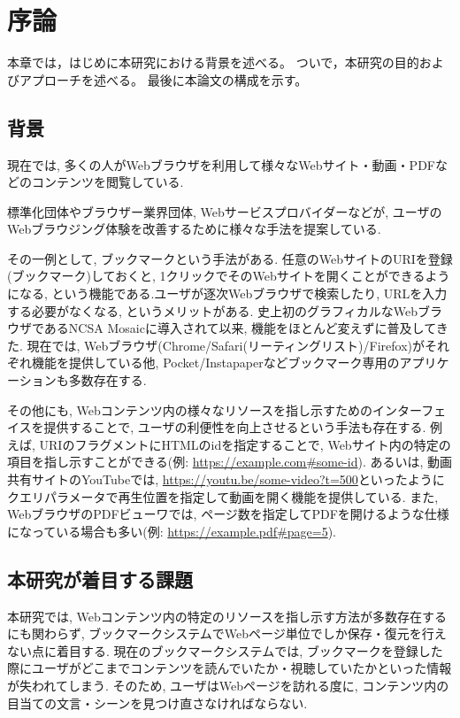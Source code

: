 \chapter{序論}
\label{chap:introduction}

本章では，はじめに本研究における背景を述べる。
ついで，本研究の目的およびアプローチを述べる。
最後に本論文の構成を示す。

\section{背景}
\label{section:background}

現在では, 多くの人がWebブラウザを利用して様々なWebサイト・動画・PDFなどのコンテンツを閲覧している.

標準化団体やブラウザー業界団体, Webサービスプロバイダーなどが, ユーザのWebブラウジング体験を改善するために様々な手法を提案している.

その一例として, ブックマークという手法がある.
任意のWebサイトのURIを登録(ブックマーク)しておくと, 1クリックでそのWebサイトを開くことができるようになる, という機能である.ユーザが逐次Webブラウザで検索したり, URLを入力する必要がなくなる, というメリットがある.
史上初のグラフィカルなWebブラウザであるNCSA Mosaic\cite{ncsa-mosaic}に導入されて以来, 機能をほとんど変えずに普及してきた.
現在では, Webブラウザ(Chrome\cite{chrome}/Safari\cite{safari}(リーティングリスト)/Firefox\cite{firefox})がそれぞれ機能を提供している他, Pocket\cite{pocket}/Instapaper\cite{instapaper}などブックマーク専用のアプリケーションも多数存在する.

その他にも, Webコンテンツ内の様々なリソースを指し示すためのインターフェイスを提供することで, ユーザの利便性を向上させるという手法も存在する.
例えば, URIのフラグメントにHTMLのidを指定することで, Webサイト内の特定の項目を指し示すことができる(例: \url{https://example.com#some-id}).
あるいは, 動画共有サイトのYouTube\cite{youtube}では, \url{https://youtu.be/some-video?t=500}といったようにクエリパラメータで再生位置を指定して動画を開く機能を提供している.
また, WebブラウザのPDFビューワでは, ページ数を指定してPDFを開けるような仕様になっている場合も多い\cite{browser-pdf-viewer-pdf-page-num-function}(例: \url{https://example.pdf#page=5}).

\section{本研究が着目する課題}
本研究では, Webコンテンツ内の特定のリソースを指し示す方法が多数存在するにも関わらず, ブックマークシステムでWebページ単位でしか保存・復元を行えない点に着目する.
現在のブックマークシステムでは, ブックマークを登録した際にユーザがどこまでコンテンツを読んでいたか・視聴していたかといった情報が失われてしまう.
そのため, ユーザはWebページを訪れる度に, コンテンツ内の目当ての文言・シーンを見つけ直さなければならない.

